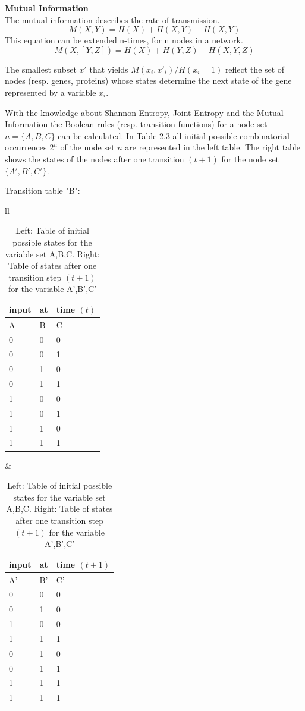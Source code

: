 \begin{defn}\textbf{Mutual Information}\\
The mutual information describes the rate of transmission.
\begin{equation}
M(X,Y)=H(X)+H(X,Y)-H(X,Y)
\end{equation}
This equation can be extended n-times, for n nodes in a network.
\begin{equation}
M(X,[Y,Z])=H(X)+H(Y,Z)-H(X,Y,Z)
\end{equation}
\end{defn}

The smallest subset $x'$ that yields $M(x_{i},x'_{i})/H(x_{i}=1)$ reflect the set of nodes (resp. genes, proteins) whose states determine the next state of the gene represented by a variable $x_i$. 

\begin{exmp}
With the knowledge about Shannon-Entropy, Joint-Entropy and the Mutual-Information the Boolean rules (resp. transition functions) for a node set $n=\{A,B,C\}$ can be calculated. In Table 2.3 all initial possible combinatorial occurrences $2^n$ of the node set $n$ are represented in the left table. The right table shows the states of the nodes after one transition $(t+1)$ for the node set $\{A',B',C'\}$.
\end{exmp}
Transition table "B":\\
\begin{table}[hbt!]
\captionsetup{width=0.6\linewidth}
\begin{center}
\begin{tabular}{ll}
\begin{tabular}{l|l|l}
input & at & time $(t)$\\
\hline
A & B & C\\
\hline
0 & 0 & 0\\
0 & 0 & 1\\
0 & 1 & 0\\
0 & 1 & 1\\
1 & 0 & 0\\
1 & 0 & 1\\
1 & 1 & 0\\
1 & 1 & 1\\
\end{tabular}
&
\begin{tabular}{l|l|l}
input & at & time $(t+1)$\\
\hline
A' & B' & C'\\
\hline
0 & 0 & 0\\
0 & 1 & 0\\
1 & 0 & 0\\
1 & 1 & 1\\
0 & 1 & 0\\
0 & 1 & 1\\
1 & 1 & 1\\
1 & 1 & 1\\
\end{tabular}
\end{tabular}
\end{center}
\caption{Left: Table of initial possible states for the variable set A,B,C. Right: Table of states after one transition step $(t+1)$ for the variable A',B',C'}
\end{table}
